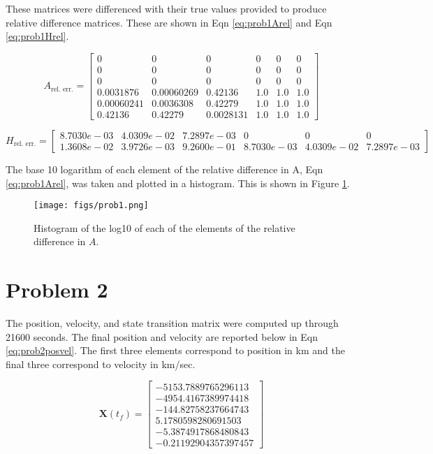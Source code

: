 \documentclass[11pt]{article}
\begin{document}
These matrices were differenced with their true values provided to produce relative difference matrices. These are shown in Eqn \eqref{eq:prob1Arel} and Eqn \eqref{eq:prob1Hrel}.

\begin{equation}
\label{eq:prob1Arel}
A_{\text{rel. err.}} = \left[\begin{array}{cccccc} 0 & 0 & 0 & 0 & 0 & 0\\ 0 & 0 & 0 & 0 & 0 & 0\\ 0 & 0 & 0 & 0 & 0 & 0\\ 0.0031876 & 0.00060269 & 0.42136 & 1.0 & 1.0 & 1.0\\ 0.00060241 & 0.0036308 & 0.42279 & 1.0 & 1.0 & 1.0\\ 0.42136 & 0.42279 & 0.0028131 & 1.0 & 1.0 & 1.0 \end{array}\right]
\end{equation}

\begin{equation}
\label{eq:prob1Hrel}
H_{\text{rel. err.}} = \begin{bmatrix}
8.7030e-03 &  4.0309e-02  & 7.2897e-03    &        0   &         0    &        0 \\
1.3608e-02 &  3.9726e-03  & 9.2600e-01  & 8.7030e-03  & 4.0309e-02 &  7.2897e-03
\end{bmatrix}
\end{equation}

The base 10 logarithm of each element of the relative difference in A, Eqn \eqref{eq:prob1Arel}, was taken and plotted in a histogram. This is shown in Figure \ref{fig:prob1A}.

\begin{figure}[!htb]
	\centering
	\texttt{[image: figs/prob1.png]}
	\caption{Histogram of the log10 of each of the elements of the relative difference in $A$.}
	\label{fig:prob1A}
\end{figure}

\section{Problem 2}

The position, velocity, and state transition matrix were computed up through 21600 seconds. The final position and velocity are reported below in Eqn \eqref{eq:prob2posvel}. The first three elements correspond to position in km and the final three correspond to velocity in km/sec.

\begin{equation}
	\label{eq:prob2posvel}
	\mathbf{X}(t_f) = \begin{bmatrix}
	-5153.7889765296113 \\
	-4954.4167389974418 \\
	-144.82758237664743 \\
	 5.1780598280691503 \\
	-5.3874917868480843 \\
	-0.21192904357397457	
	\end{bmatrix}
\end{equation}
\end{document}
